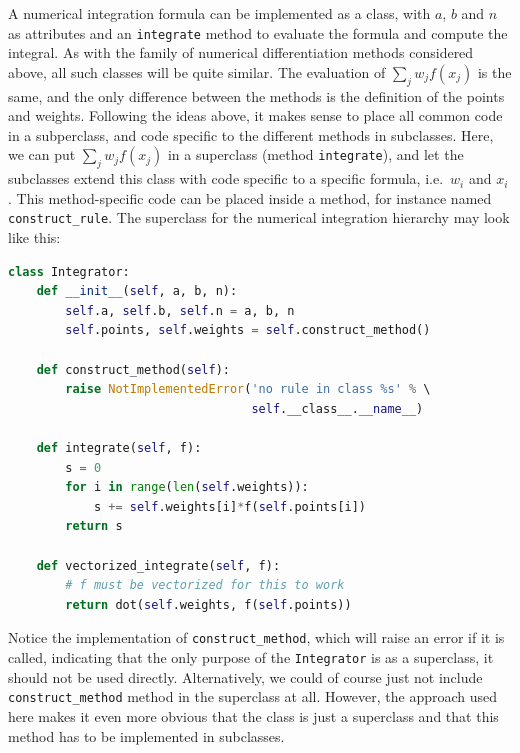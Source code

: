 \documentclass[graybox,envcountchap,sectrefs,final]{svmonodo}
\begin{document}
A numerical integration formula can be implemented as a class, with
$a$, $b$ and $n$ as attributes and an \texttt{integrate} method to evaluate the formula and compute
the integral. As with the family of numerical differentiation methods considered above,
all such classes will be quite similar. The evaluation of $\sum_jw_jf(x_j)$ is the same,
and the only difference between the methods is the definition of the points and
weights. Following the ideas above, it makes sense to place all common code in
a subperclass, and code specific to the different methods in subclasses. Here, we can
put $\sum_jw_jf(x_j)$ in a superclass (method \texttt{integrate}), and let the subclasses extend this
class with code specific to a specific formula, i.e.~$w_i$ and $x_i$. This method-specific code
can be placed inside a method, for instance named \Verb!construct_rule!. The superclass for the numerical
integration hierarchy may look like this:
\begin{lstlisting}[language=Python,style=blue1]
class Integrator:
    def __init__(self, a, b, n):
        self.a, self.b, self.n = a, b, n
        self.points, self.weights = self.construct_method()

    def construct_method(self):
        raise NotImplementedError('no rule in class %s' % \ 
                                  self.__class__.__name__)

    def integrate(self, f):
        s = 0
        for i in range(len(self.weights)):
            s += self.weights[i]*f(self.points[i])
        return s

    def vectorized_integrate(self, f):
        # f must be vectorized for this to work
        return dot(self.weights, f(self.points))
\end{lstlisting}
Notice the implementation of \Verb!construct_method!, which will raise an error if it is called, indicating
that the only purpose of the \texttt{Integrator} is as a superclass, it should not be used directly.
Alternatively, we could of course just not include \Verb!construct_method! method in the superclass at all.
However, the approach
used here makes it even more obvious that the class is just a superclass and that this method has
to be implemented in subclasses.
\end{document}
